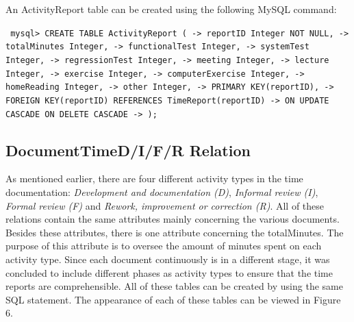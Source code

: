 \documentclass{article}
\begin{document}
An ActivityReport table can be created using the following MySQL command:
\newline

\small
\texttt{
\noindent mysql> CREATE TABLE ActivityReport (\newline
\indent\indent\indent -> reportID Integer NOT NULL,\newline
\indent\indent\indent -> totalMinutes Integer,\newline
\indent\indent\indent -> functionalTest Integer,\newline
\indent\indent\indent -> systemTest Integer,\newline
\indent\indent\indent -> regressionTest Integer,\newline
\indent\indent\indent -> meeting Integer,\newline
\indent\indent\indent -> lecture Integer,\newline
\indent\indent\indent -> exercise Integer,\newline
\indent\indent\indent -> computerExercise Integer,\newline
\indent\indent\indent -> homeReading Integer,\newline
\indent\indent\indent -> other Integer,\newline
\indent\indent\indent -> PRIMARY KEY(reportID),\newline
\indent\indent\indent -> FOREIGN KEY(reportID) REFERENCES TimeReport(reportID)\newline
\indent\indent\indent -> ON UPDATE CASCADE ON DELETE CASCADE\newline
\indent\indent\indent -> );\newline
}
\normalsize


\subsection{DocumentTimeD/I/F/R Relation}
As mentioned earlier, there are four different activity types in the time documentation: \emph{Development and documentation (D)}, \emph{Informal review (I)}, \emph{Formal review (F)} and \emph{Rework, improvement or correction (R)}. All of these relations contain the same attributes mainly concerning the various documents. Besides these attributes, there is one attribute concerning the totalMinutes. The purpose of this attribute is to oversee the amount of minutes spent on each activity type. Since each document continuously is in a different stage, it was concluded to include different phases as activity types to ensure that the time reports are comprehensible. All of these tables can be created by using the same SQL statement. The appearance of each of these tables can be viewed in Figure 6.
\end{document}

